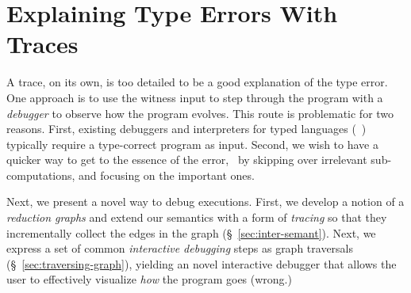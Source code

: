 \section{Explaining Type Errors With Traces}
\label{sec:interactive}

A trace, on its own, is too detailed to be
a good explanation of the type error. One approach
is to use the witness input to step through the
program with a \emph{debugger} to observe how
the program evolves.
%
This route is problematic for two reasons.
%
First, existing debuggers and interpreters for
typed languages (\eg\ \ocaml) typically require
a type-correct program as input.
%
Second, we wish to have a quicker way to get
to the essence of the error, \eg\ by skipping
over irrelevant sub-computations, and focusing
on the important ones.

Next, we present a novel way to debug executions.
%
First, we develop a notion of a \emph{reduction graphs}
and extend our semantics with a form of \emph{tracing}
so that they incrementally collect the edges
in the graph (\S~\ref{sec:inter-semant}).
%
Next, we express a set of common \emph{interactive debugging}
steps as graph traversals (\S~\ref{sec:traversing-graph}), yielding
an novel interactive debugger that allows the user
to effectively visualize \emph{how} the program goes (wrong.)




